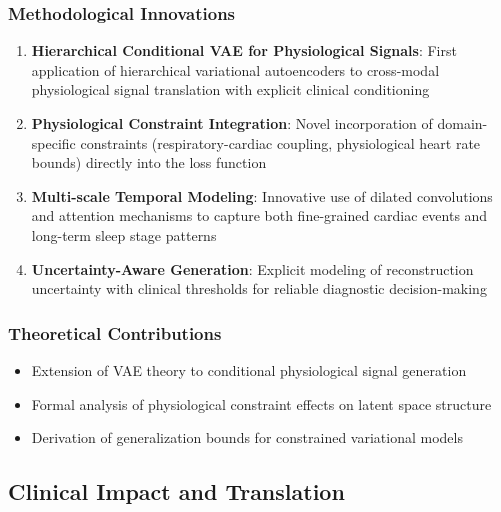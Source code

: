 \documentclass[11pt]{article}
\begin{document}
\subsubsection{Methodological Innovations}
\begin{enumerate}
    \item \textbf{Hierarchical Conditional VAE for Physiological Signals}: First application of hierarchical variational autoencoders to cross-modal physiological signal translation with explicit clinical conditioning
    
    \item \textbf{Physiological Constraint Integration}: Novel incorporation of domain-specific constraints (respiratory-cardiac coupling, physiological heart rate bounds) directly into the loss function
    
    \item \textbf{Multi-scale Temporal Modeling}: Innovative use of dilated convolutions and attention mechanisms to capture both fine-grained cardiac events and long-term sleep stage patterns
    
    \item \textbf{Uncertainty-Aware Generation}: Explicit modeling of reconstruction uncertainty with clinical thresholds for reliable diagnostic decision-making
\end{enumerate}

\subsubsection{Theoretical Contributions}
\begin{itemize}
    \item Extension of VAE theory to conditional physiological signal generation
    \item Formal analysis of physiological constraint effects on latent space structure
    \item Derivation of generalization bounds for constrained variational models
\end{itemize}

\subsection{Clinical Impact and Translation}
\end{document}
